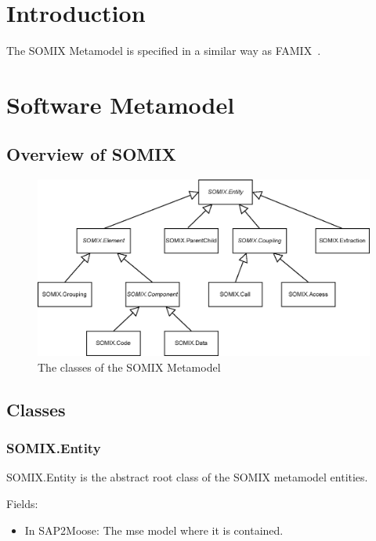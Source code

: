 \documentclass[preprint,12pt]{elsarticle}
\begin{document}

\section{Introduction}
\label{intro}
The SOMIX Metamodel is specified in a similar way as FAMIX~\cite{r_Ducasse_2011}.

\section{Software Metamodel}
\subsection{Overview of SOMIX}


\begin{figure} [h!] 
\centering

\includegraphics[width=1\columnwidth]{SOMIX_Classes.inkscape.eps} 
\caption{
The classes of the SOMIX Metamodel
}
\label{fig:InterfaceExample}   
\end{figure}
\subsection{Classes}

\subsubsection{SOMIX.Entity}

SOMIX.Entity is the abstract root class of the SOMIX metamodel entities.

Fields:
\begin{itemize}
\item In SAP2Moose: The mse model where it is contained.
\end{itemize}
\end{document}
